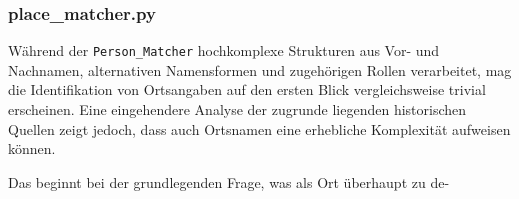 \documentclass[12pt, a4paper, ngerman, bidi=default]{article}
\newcommand{\code}[1]{\colorbox{VeryLightGray}{\texttt{#1}}} %
\begin{document}
\begin{minipage}[t]{0.38\textwidth}
\justifying%
\subsubsection{place\_matcher.py}\label{subsec:place_matcher_chapter}
  
Während der \code{Person\_Matcher} hochkomplexe Strukturen aus Vor- und Nachnamen, alternativen Namensformen und zugehörigen Rollen verarbeitet, mag die Identifikation von Ortsangaben auf den ersten Blick vergleichsweise trivial erscheinen. Eine eingehendere Analyse der zugrunde liegenden historischen Quellen zeigt jedoch, dass auch Ortsnamen eine erhebliche Komplexität aufweisen können.

Das beginnt bei der grundlegenden Frage, was als Ort überhaupt zu de-

\end{minipage}%
\hfill
\end{document}
